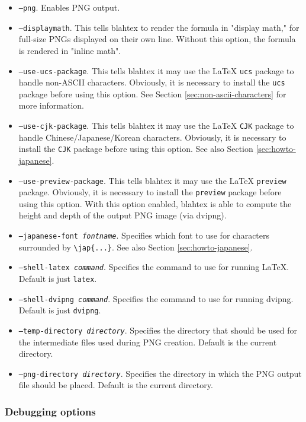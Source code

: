 \documentclass{article}
\newcommand{\texcommand}[1]{\textbackslash{}#1}
\begin{document}
\begin{itemize}
\item \texttt{--png}. Enables PNG output.
\item \texttt{--displaymath}. This tells blahtex to render the formula in "display math," for full-size PNGs displayed on their own line. Without this option, the formula is rendered in "inline math".
\item \texttt{--use-ucs-package}. This tells blahtex it may use the \LaTeX{} \texttt{ucs} package to handle non-ASCII characters. Obviously, it is necessary to install the \texttt{ucs} package before using this option. See Section \ref{sec:non-ascii-characters} for more information.
\item \texttt{--use-cjk-package}. This tells blahtex it may use the \LaTeX{} \texttt{CJK} package to handle Chinese/Japanese/Korean characters. Obviously, it is necessary to install the \texttt{CJK} package before using this option. See also Section \ref{sec:howto-japanese}.
\item \texttt{--use-preview-package}. This tells blahtex it may use the \LaTeX{} \texttt{preview} package. Obviously, it is necessary to install the \texttt{preview} package before using this option. With this option enabled, blahtex is able to compute the height and depth of the output PNG image (via dvipng).
\item \texttt{--japanese-font \textit{fontname}}. Specifies which font to use for characters surrounded by \texttt{\texcommand{jap}\{...\}}. See also Section \ref{sec:howto-japanese}.
\item \texttt{--shell-latex \textit{command}}. Specifies the command to use for running \LaTeX{}. Default is just \texttt{latex}.
\item \texttt{--shell-dvipng \textit{command}}. Specifies the command to use for running dvipng. Default is just \texttt{dvipng}.
\item \texttt{--temp-directory \textit{directory}}. Specifies the directory that should be used for the intermediate files used during PNG creation. Default is the current directory.
\item \texttt{--png-directory \textit{directory}}. Specifies the directory in which the PNG output file should be placed. Default is the current directory.
\end{itemize}

\subsubsection{Debugging options}
\end{document}
